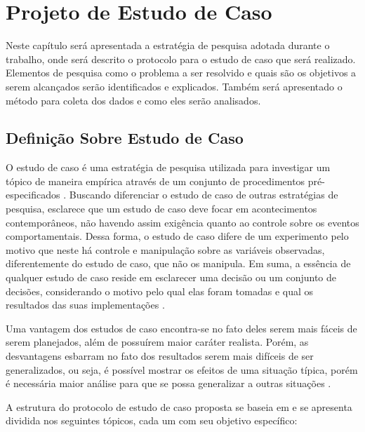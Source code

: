 \chapter{Projeto de Estudo de Caso}

Neste capítulo será apresentada a estratégia de pesquisa adotada durante o trabalho, onde será descrito o protocolo para o estudo de caso que será realizado. Elementos de pesquisa como o problema a ser resolvido e quais são os objetivos a serem alcançados serão identificados e explicados. Também será apresentado o método para coleta dos dados e como eles serão analisados.


\section{Definição Sobre Estudo de Caso}

O estudo de caso é uma estratégia de pesquisa utilizada para investigar um tópico de maneira empírica através de um conjunto de procedimentos pré-especificados \cite{yin2001estudo}. Buscando diferenciar o estudo de caso de outras estratégias de pesquisa,  esclarece que um estudo de caso deve focar em acontecimentos contemporâneos, não havendo assim exigência quanto ao controle sobre os eventos comportamentais. Dessa forma, o estudo de caso difere de um experimento pelo motivo que neste há controle e manipulação sobre as variáveis observadas, diferentemente do estudo de caso, que não os manipula. Em suma, a essência de qualquer estudo de caso reside em esclarecer uma decisão ou um conjunto de decisões, considerando o motivo pelo qual elas foram tomadas e qual os resultados das suas implementações \cite{schramm_notes_1971}. 

Uma vantagem dos estudos de caso encontra-se no fato deles serem mais fáceis de serem planejados, além de possuírem maior caráter realista. Porém, as desvantagens esbarram no fato dos resultados serem mais difíceis de ser generalizados, ou seja, é possível mostrar os efeitos de uma situação típica, porém é necessária maior análise para que se possa generalizar a outras situações \cite{wohlin2012experimentation}.


A estrutura do protocolo de estudo de caso proposta se baseia em  e se apresenta dividida nos seguintes tópicos, cada um com seu objetivo específico:

